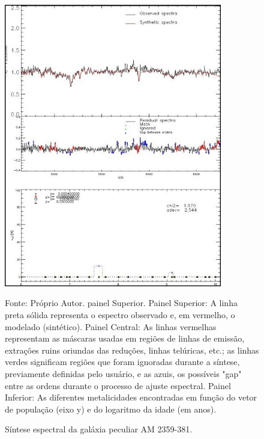 \begin{figure}[H]
	\centering	
    \caption{Síntese espectral da galáxia peculiar AM 2359-381.}
    \includegraphics[width=0.85\textwidth]{figuras/normal.jpg}
   	\begin{center}
        \normalsize Fonte: Próprio Autor. painel Superior.\vskip 0.5cm Painel Superior: A linha preta sólida representa o espectro observado e, em vermelho, o modelado (sintético). Painel Central: As linhas vermelhas representam as máscaras usadas em regiões de linhas de emissão, extrações ruins oriundas das reduções, linhas telúricas, etc.; as linhas verdes significam regiões que foram ignoradas durante a síntese, previamente definidas pelo usuário, e as azuis, os possíveis "gap" entre as ordens durante o processo de ajuste espectral. Painel Inferior: As diferentes metalicidades encontradas em função do vetor de população (eixo y) e do logaritmo da idade (em anos).
    \end{center}
	\label{fig:normal}
\end{figure}


